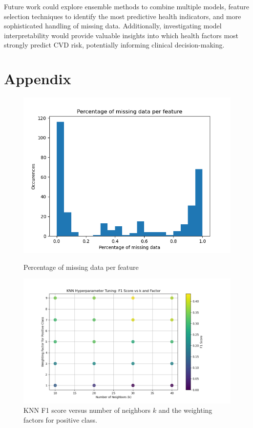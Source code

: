 \documentclass[10pt,conference,compsocconf]{IEEEtran}
\begin{document}
Future work could explore ensemble methods to combine multiple models, feature selection techniques to identify the most predictive health indicators, and more sophisticated handling of missing data. Additionally, investigating model interpretability would provide valuable insights into which health factors most strongly predict CVD risk, potentially informing clinical decision-making.


\clearpage
\onecolumn 
\section{Appendix}

\begin{figure}[h]
  \centering
  \begin{minipage}{0.48\textwidth}
    \centering
    \includegraphics[width=\linewidth]{Missing_data.png}  
    \caption{Percentage of missing data per feature}
    \label{fig:missing}  
  \end{minipage}
  \hfill
  \begin{minipage}{0.48\textwidth}
    \centering
    \includegraphics[width=\linewidth]{KNN_F1_Scores_CV1.png}  
    \caption{KNN F1 score versus number of neighbors $k$ and the weighting factors for positive class.}
    \label{fig:KNN}  
  \end{minipage}
\end{figure}
\end{document}

